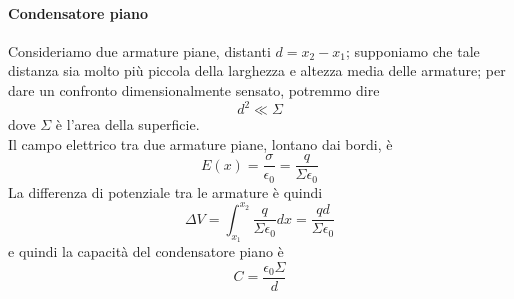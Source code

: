 \paragraph{Condensatore piano}
Consideriamo due armature piane, distanti $d=x_2-x_1$; supponiamo che tale distanza sia molto più piccola della larghezza e altezza media delle armature; per dare un confronto dimensionalmente sensato, potremmo dire
\begin{equation}
	d^2\ll \Sigma
\end{equation}
dove $\Sigma$ è l'area della superficie.\\
Il campo elettrico tra due armature piane, lontano dai bordi, è%
\begin{equation*}
	E(x)=\frac{\sigma}{\epsilon_0}=\frac{q}{\Sigma \epsilon_0}
\end{equation*}
La differenza di potenziale tra le armature è quindi
\begin{equation*}
	\Delta V=\int_{x_1}^{x_2}\frac{q}{\Sigma \epsilon_0}dx=\frac{qd}{\Sigma \epsilon_0}
\end{equation*}
e quindi la capacità del condensatore piano è
\begin{equation}
	C=\frac{\epsilon_0\Sigma}{d}
\end{equation}
